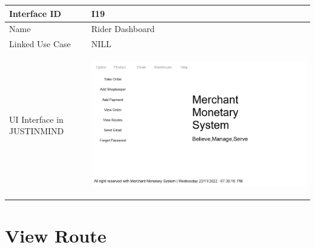\documentclass[12pt,a4paper]{report}
\begin{document}
\begin{tabular}{ | m{3cm} | m{12cm}| } \hline

Interface ID & I19  \\\hline

Name  & Rider Dashboard  \\ \hline

Linked Use Case & NILL  \\ \hline

UI Interface in JUSTINMIND & \begin{center} \includegraphics[scale=0.3]{./User Interface/UI-018 Rider Dashboard@1x.png}\end{center}  \\ \hline

\end{tabular} 

\section{View Route }
\end{document}
